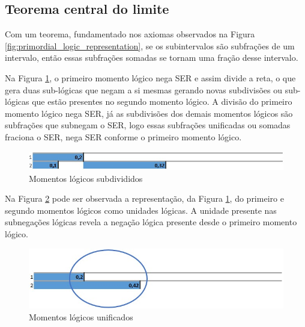 \subsection{Teorema central do limite}
Com um teorema, fundamentado nos axiomas observados na Figura \ref{fig:primordial_logic_representation}, se os subintervalos são subfrações de um intervalo, então essas subfrações somadas se tornam uma fração desse intervalo.

Na Figura \ref{fig:second_logical_moment}, o primeiro momento lógico nega SER e assim divide a reta, o que gera duas sub-lógicas que negam a si mesmas gerando novas subdivisões ou sub-lógicas que estão presentes no segundo momento lógico. A divisão do primeiro momento lógico nega SER, já as subdivisões dos demais momentos lógicos são subfrações que subnegam o SER, logo essas subfrações unificadas ou somadas fraciona o SER, nega SER conforme o primeiro momento lógico. 
\begin{figure}[H]
\caption{Momentos lógicos subdivididos}
\label{fig:second_logical_moment}
\centering
\includegraphics[scale=.85]{sections/images/second_logical_moment.jpg}
\end{figure}

Na Figura \ref{fig:logical_units} pode ser observada a representação, da Figura \ref{fig:second_logical_moment}, do primeiro e segundo momentos lógicos como unidades lógicas. A unidade presente nas subnegações lógicas revela a negação lógica presente desde o primeiro momento lógico.
\begin{figure}[H]
\caption{Momentos lógicos unificados}
\label{fig:logical_units}
\centering
\includegraphics[scale=.85]{sections/images/logical_units.jpg}
\end{figure}

